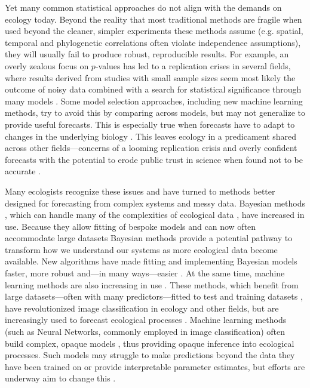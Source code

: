\documentclass[11pt]{article}
\begin{document}
Yet many common statistical approaches do not align with the demands on ecology today. Beyond the reality that most traditional methods are fragile when used beyond the cleaner, simpler experiments these methods assume (e.g. spatial, temporal and phylogenetic correlations often violate independence assumptions), they will usually fail to produce robust, reproducible results. For example, an overly zealous focus on $p$-values has led to a replication crises in several fields, where results derived from studies with small sample sizes seem most likely the outcome of noisy data combined with a search for statistical significance through many models \citep[effectively a garden of forking paths,][]{halsey2015,loken2017}. Some model selection approaches, including new machine learning methods, try to avoid this by comparing across models, but may not generalize to provide useful forecasts. This is especially true when forecasts have to adapt to changes in the underlying biology  \citep{boettiger2022forecast}. This leaves ecology in a predicament shared across other fields---concerns of a looming replication crisis \citep{filazzola2021replication,fraser2020role} and overly confident forecasts with the potential to erode public trust in science when found not to be accurate \citep{leroux2019prevalence,boettiger2022forecast}. 

Many ecologists recognize these issues and have turned to methods better designed for forecasting from complex systems and messy data. Bayesian methods \citep{anderson2021trends}, which can handle many of the complexities of ecological data \citep{hobbs2006alternatives}, have increased in use. Because they allow fitting of bespoke models and can now often accommodate large datasets Bayesian methods provide a potential pathway to transform how we understand our systems as more ecological data become available. New algorithms \citep[e.g. Hamiltonian Monte Carlo,][]{nuts2014,betan2019} have made fitting and implementing Bayesian models faster, more robust and---in many ways---easier \citep{Carpenter:2017stan}. At the same time, machine learning methods are also increasing in use \citep{pichler2023machine}. These methods, which benefit from large datasets---often with many predictors---fitted to test and training datasets \citep{breiman2001statistical}, have revolutionized image classification in ecology and other fields, but are increasingly used to forecast ecological processes \citep[e.g.,][]{zwart2023near}. Machine learning methods (such as Neural Networks, commonly employed in image classification) often build complex, opaque models \citep{CoxTwoCultures,EfronTwoCultures,shmueli2010explain}, thus providing opaque inference into ecological processes. Such models may struggle to make predictions beyond the data they have been trained on or provide interpretable parameter estimates, but efforts are underway aim to change this \citep[e.g.,][]{kutz2023machine}. 
\end{document}
